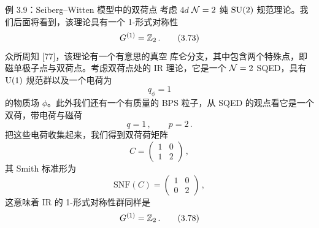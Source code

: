
\begin{examplebox}{例 3.9：Seiberg--Witten 模型中的双荷点}
考虑 $4d$ $\mathcal{N}=2$ 纯 $\mathrm{SU}(2)$ 规范理论。我们后面将看到，该理论具有一个 1-形式对称性
\begin{equation}
  G^{(1)}=\mathbb{Z}_2\,. \tag{3.73}
\end{equation}
众所周知 [77]，该理论有一个有意思的真空 库仑分支，其中包含两个特殊点，即磁单极子点与双荷点。考虑双荷点处的 IR 理论，它是一个 $\mathcal{N}=2$ SQED，具有 $\mathrm{U}(1)$ 规范群以及一个电荷为
\begin{equation}
  q_\phi=1 \tag{3.74}
\end{equation}
的物质场 $\phi$。此外我们还有一个有质量的 BPS 粒子，从
SQED 的观点看它是一个双荷，带电荷与磁荷
\begin{equation}
  q=1\,,\qquad p=2\,. \tag{3.75}
\end{equation}
把这些电荷收集起来，我们得到双荷荷矩阵
\begin{equation}
  C=\begin{pmatrix} 1 & 0\\ 1 & 2\end{pmatrix}\,, \tag{3.76}
\end{equation}
其 Smith 标准形为
\begin{equation}
  \mathrm{SNF}(C)=\begin{pmatrix} 1 & 0\\ 0 & 2\end{pmatrix}\,, \tag{3.77}
\end{equation}
这意味着 IR 的 1-形式对称性群同样是
\begin{equation}
  G^{(1)}=\mathbb{Z}_2\,. \tag{3.78}
\end{equation}
\end{examplebox}

